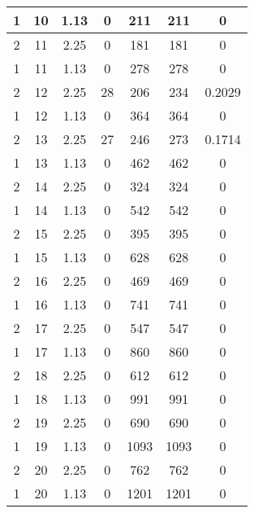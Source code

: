 \documentclass[letterpaper, 12pt]{article}
\begin{document}
\begin{longtable}{|c|c|c|c|c|c|c|}
\hline
1 & 10 & 1.13 & 0 & 211 & 211 & 0 \\
\hline
2 & 11 & 2.25 & 0 & 181 & 181 & 0 \\
\hline
1 & 11 & 1.13 & 0 & 278 & 278 & 0 \\
\hline
2 & 12 & 2.25 & 28 & 206 & 234 & 0.2029 \\
\hline
1 & 12 & 1.13 & 0 & 364 & 364 & 0 \\
\hline
2 & 13 & 2.25 & 27 & 246 & 273 & 0.1714 \\
\hline
1 & 13 & 1.13 & 0 & 462 & 462 & 0 \\
\hline
2 & 14 & 2.25 & 0 & 324 & 324 & 0 \\
\hline
1 & 14 & 1.13 & 0 & 542 & 542 & 0 \\
\hline
2 & 15 & 2.25 & 0 & 395 & 395 & 0 \\
\hline
1 & 15 & 1.13 & 0 & 628 & 628 & 0 \\
\hline
2 & 16 & 2.25 & 0 & 469 & 469 & 0 \\
\hline
1 & 16 & 1.13 & 0 & 741 & 741 & 0 \\
\hline
2 & 17 & 2.25 & 0 & 547 & 547 & 0 \\
\hline
1 & 17 & 1.13 & 0 & 860 & 860 & 0 \\
\hline
2 & 18 & 2.25 & 0 & 612 & 612 & 0 \\
\hline
1 & 18 & 1.13 & 0 & 991 & 991 & 0 \\
\hline
2 & 19 & 2.25 & 0 & 690 & 690 & 0 \\
\hline
1 & 19 & 1.13 & 0 & 1093 & 1093 & 0 \\
\hline
2 & 20 & 2.25 & 0 & 762 & 762 & 0 \\
\hline
1 & 20 & 1.13 & 0 & 1201 & 1201 & 0 \\
\hline
\end{longtable}
\end{document}
